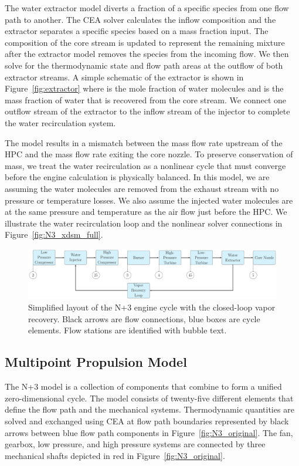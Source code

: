 \documentclass[conf]{new-aiaa}
\begin{document}
The water extractor model diverts a fraction of a specific species from one flow path to another.
The CEA solver calculates the inflow composition and the extractor separates a specific species based on a mass fraction input.
The composition of the core stream is updated to represent the remaining mixture after the extractor model removes the species from the incoming flow.
We then solve for the thermodynamic state and flow path areas at the outflow of both extractor streams.
A simple schematic of the extractor is shown in Figure~\ref{fig:extractor} where  is the mole fraction of water molecules and  is the mass fraction of water that is recovered from the core stream.
We connect one outflow stream of the extractor to the inflow stream of the injector to complete the water recirculation system.

The model results in a mismatch between the mass flow rate upstream of the HPC and the mass flow rate exiting the core nozzle.
To preserve conservation of mass, we treat the water recirculation as a nonlinear cycle that must converge before the engine calculation is physically balanced.
In this model, we are assuming the water molecules are removed from the exhaust stream with no pressure or temperature losses.
We also assume the injected water molecules are at the same pressure and temperature as the air flow just before the HPC.
We illustrate the water recirculation loop and the nonlinear solver connections in Figure~\ref{fig:N3_xdsm_full}.

\begin{figure}[hbt!]
  \centering
  \includegraphics[width=1.0\textwidth]{N3_CLVR_cycle.pdf}
  \caption{
    Simplified layout of the N+3 engine cycle with the closed-loop vapor recovery.
    Black arrows are flow connections, blue boxes are cycle elements.
    Flow stations are identified with bubble text.
  }
  \label{fig:n3_clvr}
\end{figure}

\subsection{Multipoint Propulsion Model}
The N+3 model is a collection of components that combine to form a unified zero-dimensional cycle.
The model consists of twenty-five different elements that define the flow path and the mechanical systems.
Thermodynamic quantities are solved and exchanged using CEA at flow path boundaries represented by black arrows between blue flow path components in Figure~\ref{fig:N3_original}.
The fan, gearbox, low pressure, and high pressure systems are connected by three mechanical shafts depicted in red in Figure~\ref{fig:N3_original}.
\end{document}
